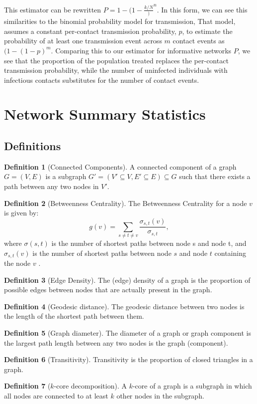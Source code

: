 \documentclass{article}
\theoremstyle{definition}
\newtheorem{definition}{Definition}[section]
\begin{document}
This estimator can be rewritten $P=1-(1-\frac{k/N})^n$. In this form, we can see this similarities to the binomial probability model for transmission\cite{becker_general_1981}, That model, assumes a constant per-contact transmission probability, $p$, to estimate the probability of at least one transmission event across $m$ contact events as $(1-(1-p)^m$. Comparing this to our estimator for informative networks $P$, we see that the proportion of the population treated replaces the per-contact transmission probability, while the number of uninfected individuals with infectious contacts substitutes for the number of contact events.

\newpage

\section{\textbf{Network Summary Statistics}}
\label {Appendix 2}
\subsection{Definitions}
\begin{definition}[Connected Components]
A connected component of a graph $G=(V,E)$ is a subgraph $G'=(V' \subseteq V,E' \subseteq E)\subseteq G$ such that there exists a path between any two nodes in $V'$.
\end{definition}
\begin{definition}[Betweenness Centrality]
The Betweenness Centrality for a node $v$ is given by: $$g(v)=\sum_{s\neq t\neq v}\frac{\sigma_{s,t}(v)}{\sigma_{s,t}},$$ where $\sigma(s,t)$ is  the number of shortest paths between node s and node t, and  $\sigma_{s,t}(v)$ is the number of shortest paths between node $s$ and node $t$ containing the node $v$ \cite{barabasi_network_2016}.
\end{definition}
\begin{definition}[Edge Density]
The (edge) density of a graph is the proportion of possible edges between nodes
that are actually present in the graph.
\end{definition}
\begin{definition}[Geodesic distance]
The geodesic distance between two nodes is the length of the shortest path between them.
\end{definition}
\begin{definition}[Graph diameter]
The diameter of a graph or graph component is the largest path length between any two nodes is the graph (component).
\end{definition}
\begin{definition}[Transitivity]
Transitivity is the proportion of closed triangles in a graph.
\end{definition}
\begin{definition}[$k$-core decomposition]
A $k$-core of a graph is a subgraph in which all nodes are connected to at least $k$ other nodes in the subgraph.
\end{definition}
\end{document}
